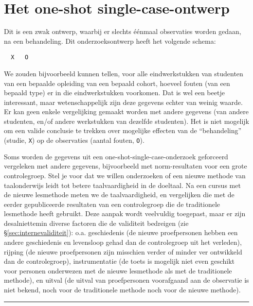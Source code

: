 \documentclass[
]{book}
\begin{document}
\hypertarget{het-one-shot-single-case-ontwerp}{%
\section{Het one-shot single-case-ontwerp}\label{het-one-shot-single-case-ontwerp}}

Dit is een zwak ontwerp, waarbij er slechts éénmaal observaties worden
gedaan, na een behandeling. Dit onderzoeksontwerp heeft het volgende
schema:

\begin{verbatim}
  X   O
\end{verbatim}

We zouden bijvoorbeeld kunnen tellen, voor alle eindwerkstukken van
studenten van een bepaalde opleiding van een bepaald cohort, hoeveel
fouten (van een bepaald type) er in die eindwerkstukken voorkomen. Dat
is wel een beetje interessant, maar wetenschappelijk zijn deze gegevens
echter van weinig waarde. Er kan geen enkele vergelijking gemaakt worden
met andere gegevens (van andere studenten, en/of andere werkstukken van
dezelfde studenten). Het is niet mogelijk om een valide conclusie te
trekken over mogelijke effecten van de ``behandeling'' (studie, \texttt{X}) op de
observaties (aantal fouten, \texttt{O}).

Soms worden de gegevens uit een one-shot-single-case-onderzoek
geforceerd vergeleken met andere gegevens, bijvoorbeeld met
norm-resultaten voor een grote controlegroep. Stel je voor dat we willen
onderzoeken of een nieuwe methode van taalonderwijs leidt tot betere
taalvaardigheid in de doeltaal. Na een cursus met de nieuwe lesmethode
meten we de taalvaardigheid, en vergelijken die met de eerder
gepubliceerde resultaten van een controlegroep die de traditionele
lesmethode heeft gebruikt. Deze aanpak wordt veelvuldig toegepast, maar
er zijn desalniettemin diverse factoren die de validiteit bedreigen (zie
§\ref{sec:internevaliditeit}): o.a. geschiedenis (de nieuwe
proefpersonen hebben een andere geschiedenis en levensloop gehad dan de
controlegroep uit het verleden), rijping (de nieuwe proefpersonen zijn
misschien verder of minder ver ontwikkeld dan de controlegroep),
instrumentatie (de toets is mogelijk niet even geschikt voor personen
onderwezen met de nieuwe lesmethode als met de traditionele methode), en
uitval (de uitval van proefpersonen voorafgaand aan de observatie is
niet bekend, noch voor de traditionele methode noch voor de nieuwe
methode).

\begin{center}\rule{0.5\linewidth}{0.5pt}\end{center}
\end{document}
